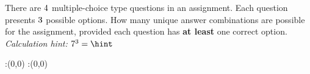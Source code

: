 



\gcalcexpr[0]{\total}{\vbthree ^ \vbone}

\question[3] There are $4$ multiple-choice type questions in an assignment. 
Each question presents $3$ possible options. How many unique answer 
combinations are possible for the assignment, provided each question has 
\textbf{at least} one correct option.\\
\textit{Calculation hint: $\vbthree^3=\hint$}


\watchout

\ifprintanswers
  \begin{marginfigure}
      :(0,0)
      :(0,0)
    \figdrawbegin{}
      \figdrawline [100,101]
    \figdrawend
    \figvisu{\figBoxA}{}{%
    }
    \centerline{\box\figBoxA}
  \end{marginfigure}
\fi 

